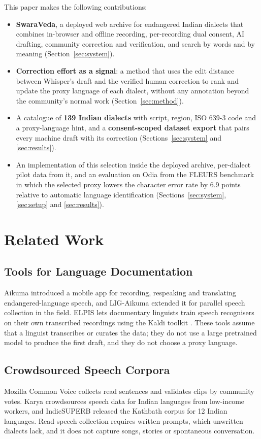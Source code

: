 \documentclass[conference]{IEEEtran}
\begin{document}
This paper makes the following contributions:
\begin{itemize}
\item \textbf{SwaraVeda}, a deployed web archive for endangered Indian dialects that combines in-browser and offline recording, per-recording dual consent, AI drafting, community correction and verification, and search by words and by meaning (Section~\ref{sec:system}).
\item \textbf{Correction effort as a signal}: a method that uses the edit distance between Whisper's draft and the verified human correction to rank and update the proxy language of each dialect, without any annotation beyond the community's normal work (Section~\ref{sec:method}).
\item A catalogue of \textbf{139 Indian dialects} with script, region, ISO 639-3 code and a proxy-language hint, and a \textbf{consent-scoped dataset export} that pairs every machine draft with its correction (Sections~\ref{sec:system} and \ref{sec:results}).
\item An implementation of this selection inside the deployed archive, per-dialect pilot data from it, and an evaluation on Odia from the FLEURS benchmark in which the selected proxy lowers the character error rate by 6.9 points relative to automatic language identification (Sections~\ref{sec:system}, \ref{sec:setup} and \ref{sec:results}).
\end{itemize}

\section{Related Work}
\subsection{Tools for Language Documentation}
Aikuma \cite{bird2014} introduced a mobile app for recording, respeaking and translating endangered-language speech, and LIG-Aikuma \cite{blachon2016} extended it for parallel speech collection in the field. ELPIS \cite{foley2018} lets documentary linguists train speech recognisers on their own transcribed recordings using the Kaldi toolkit \cite{povey2011}. These tools assume that a linguist transcribes or curates the data; they do not use a large pretrained model to produce the first draft, and they do not choose a proxy language.

\subsection{Crowdsourced Speech Corpora}
Mozilla Common Voice \cite{ardila2020} collects read sentences and validates clips by community votes. Karya \cite{abraham2020} crowdsources speech data for Indian languages from low-income workers, and IndicSUPERB \cite{javed2023} released the Kathbath corpus for 12 Indian languages. Read-speech collection requires written prompts, which unwritten dialects lack, and it does not capture songs, stories or spontaneous conversation.
\end{document}
